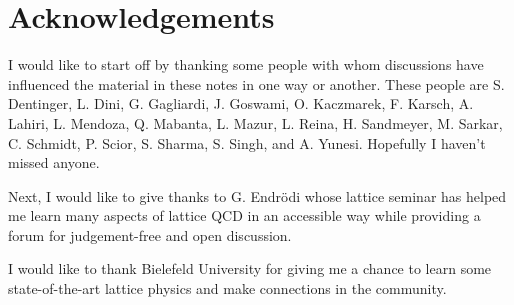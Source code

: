\documentclass[12pt]{book}
\theoremstyle{definition}
\newenvironment{frontstuff}
  {\centering\chapter*{}}
  {\clearpage}
\begin{document}
\begin{frontstuff}


\end{frontstuff} %


\chapter{Acknowledgements}

I would like to start off by thanking some people with whom discussions
have influenced the material in these notes in one way or another.
These people are
S. Dentinger,
L. Dini,
G. Gagliardi,
J. Goswami,
O. Kaczmarek,
F. Karsch,
A. Lahiri,
L. Mendoza,
Q. Mabanta,
L. Mazur,
L. Reina,
H. Sandmeyer,
M. Sarkar,
C. Schmidt,
P. Scior,
S. Sharma,
S. Singh,
and
A. Yunesi.
Hopefully I haven't missed anyone.

Next, I would like to give thanks to G. Endr\"odi whose lattice seminar
has helped me learn many aspects of lattice QCD in an accessible way while
providing a forum for judgement-free and open discussion.

I would like to thank Bielefeld University for giving me a chance to learn some
state-of-the-art lattice physics and make connections in the community.
\end{document}
